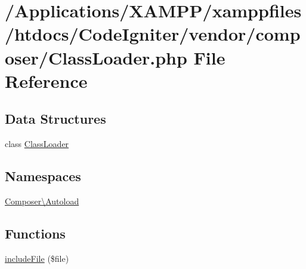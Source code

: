 \hypertarget{_class_loader_8php}{}\section{/\+Applications/\+X\+A\+M\+P\+P/xamppfiles/htdocs/\+Code\+Igniter/vendor/composer/\+Class\+Loader.php File Reference}
\label{_class_loader_8php}
\subsection*{Data Structures}
\begin{DoxyCompactItemize}
\item 
class \mbox{\hyperlink{class_composer_1_1_autoload_1_1_class_loader}{Class\+Loader}}
\end{DoxyCompactItemize}
\subsection*{Namespaces}
\begin{DoxyCompactItemize}
\item 
 \mbox{\hyperlink{namespace_composer_1_1_autoload}{Composer\textbackslash{}\+Autoload}}
\end{DoxyCompactItemize}
\subsection*{Functions}
\begin{DoxyCompactItemize}
\item 
\mbox{\hyperlink{namespace_composer_1_1_autoload_a578ac7c710d884fb0ec5a8e6fd14d79f}{include\+File}} (\$file)
\end{DoxyCompactItemize}
